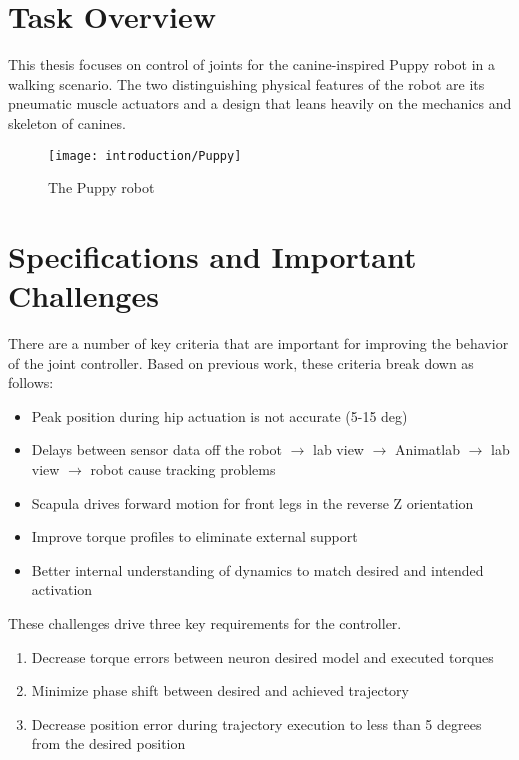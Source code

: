 \section{Task Overview}

This thesis focuses on control of joints for the canine-inspired
Puppy robot in a walking scenario. The two distinguishing physical features of 
the robot are its pneumatic muscle actuators and a design that leans heavily
on the mechanics and skeleton of canines.

\begin{figure}
\centering
\texttt{[image: introduction/Puppy]}
\caption{The Puppy robot}
\label{fig:Puppy}
\end{figure}

\section{Specifications and Important Challenges}

There are a number of key criteria that are important for improving the behavior
of the joint controller. Based on previous work, these criteria break down as follows:

\begin{itemize}
\item Peak position during hip actuation is not accurate (5-15 deg) 
\item Delays between sensor data off the robot $\rightarrow$ lab view $\rightarrow$ Animatlab $\rightarrow$ lab
view $\rightarrow$ robot cause tracking problems
\item Scapula drives forward motion for front legs in the reverse Z orientation
\item Improve torque profiles to eliminate external support
\item Better internal understanding of dynamics to match desired and intended activation
\end{itemize}

These challenges drive three key requirements for the controller.

\begin{enumerate}
\item Decrease torque errors between neuron desired model and executed torques
\item Minimize phase shift between desired and achieved trajectory
\item Decrease position error during trajectory execution to less than 5 degrees from the desired position
\end{enumerate}

